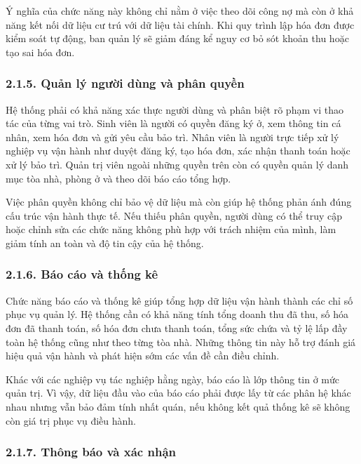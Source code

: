 \documentclass[12pt]{article}
\begin{document}
Ý nghĩa của chức năng này không chỉ nằm ở việc theo dõi công nợ mà còn ở khả năng kết nối dữ liệu cư trú với dữ liệu tài chính. Khi quy trình lập hóa đơn được kiểm soát tự động, ban quản lý sẽ giảm đáng kể nguy cơ bỏ sót khoản thu hoặc tạo sai hóa đơn.

\subsubsection*{2.1.5. Quản lý người dùng và phân quyền}

Hệ thống phải có khả năng xác thực người dùng và phân biệt rõ phạm vi thao tác của từng vai trò. Sinh viên là người có quyền đăng ký ở, xem thông tin cá nhân, xem hóa đơn và gửi yêu cầu bảo trì. Nhân viên là người trực tiếp xử lý nghiệp vụ vận hành như duyệt đăng ký, tạo hóa đơn, xác nhận thanh toán hoặc xử lý bảo trì. Quản trị viên ngoài những quyền trên còn có quyền quản lý danh mục tòa nhà, phòng ở và theo dõi báo cáo tổng hợp.

Việc phân quyền không chỉ bảo vệ dữ liệu mà còn giúp hệ thống phản ánh đúng cấu trúc vận hành thực tế. Nếu thiếu phân quyền, người dùng có thể truy cập hoặc chỉnh sửa các chức năng không phù hợp với trách nhiệm của mình, làm giảm tính an toàn và độ tin cậy của hệ thống.

\subsubsection*{2.1.6. Báo cáo và thống kê}

Chức năng báo cáo và thống kê giúp tổng hợp dữ liệu vận hành thành các chỉ số phục vụ quản lý. Hệ thống cần có khả năng tính tổng doanh thu đã thu, số hóa đơn đã thanh toán, số hóa đơn chưa thanh toán, tổng sức chứa và tỷ lệ lấp đầy toàn hệ thống cũng như theo từng tòa nhà. Những thông tin này hỗ trợ đánh giá hiệu quả vận hành và phát hiện sớm các vấn đề cần điều chỉnh.

Khác với các nghiệp vụ tác nghiệp hằng ngày, báo cáo là lớp thông tin ở mức quản trị. Vì vậy, dữ liệu đầu vào của báo cáo phải được lấy từ các phân hệ khác nhau nhưng vẫn bảo đảm tính nhất quán, nếu không kết quả thống kê sẽ không còn giá trị phục vụ điều hành.

\subsubsection*{2.1.7. Thông báo và xác nhận}
\end{document}
